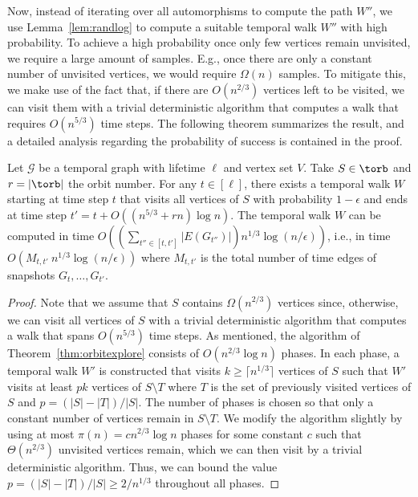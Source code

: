 {Now, instead of iterating over all automorphisms to compute the path $W''$, we
use Lemma~\ref{lem:randlog} to compute %
{a suitable}
temporal walk $W''$ with
high probability. {To achieve a high probability once only few
    vertices remain unvisited, we require a large amount of samples. E.g.,
    once there are only a constant number of unvisited vertices, we would
    require $\Omega(n)$ samples. To mitigate this, we make use of the fact
    that, if there are $O(n^{2/3})$ vertices left to be visited, we can visit them with
a trivial deterministic algorithm that computes a walk that requires $O(n^{5/3})$
time steps.}
The following theorem summarizes the result, and a detailed
analysis regarding the probability of success is contained in the proof.

\begin{theorem}\label{thm:randorbitexplore} Let $\mathcal{G}$ be a temporal
    graph with lifetime $\ell$ and vertex set $V$. Take $S \in \torb$ and
    $r=|\torb|$ the orbit number. For any $t\in[\ell]$, there exists a
    temporal walk $W$ starting at time step $t$ that visits all vertices of
    $S$ with probability $1-\epsilon$ and ends at time step
    $t'=t+O((n^{5/3}+rn)\log n)$. The temporal walk $W$ can be computed in
    time $O((\sum_{t'' \in [t, t']} |E(G_{t''})|) n^{1/3}\log (n/\epsilon))$, {i.e.,
    in time $O( M_{t,t'} \ n^{1/3} \log (n/\epsilon))$ where $M_{t,t'}$ is the total number
    of time edges of snapshots $G_t, \ldots, G_{t'}$.}
\end{theorem} 
\begin{proof} 
    Note that we assume that $S$ contains $\Omega(n^{2/3})$ vertices since,
    otherwise, we can visit all vertices of $S$ with a trivial deterministic algorithm that
    computes a walk that spans $O(n^{5/3})$ time steps. As mentioned, the
    algorithm of Theorem~\ref{thm:orbitexplore} consists of $O(n^{2/3}\log
    n)$ phases. In each phase, a temporal {walk $W'$} is constructed that visits
    $k\geq \lceil n^{1/3} \rceil$ vertices of $S$ such that {$W'$ visits} at least
    $pk$ vertices of $S \setminus T$ where $T$ is the set of previously visited
    vertices of $S$ and $p=(|S|-|T|)/|S|$. The number of phases is chosen so
    that only a constant number of vertices remain in $S\setminus T$. We modify
    the algorithm slightly by using at most $\pi(n)=c n^{2/3} \log n$ phases
    for some constant $c$ such that $\Theta(n^{2/3})$ unvisited vertices
    remain, which
    we can then visit by a trivial deterministic algorithm. Thus, we can  bound the value 
    {$p=(|S|-|T|)/|S| \geq 2/n^{1/3}$} throughout all phases.


\end{proof}}
